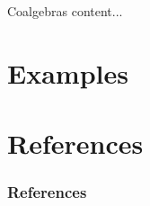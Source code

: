 \documentclass[10pt,t]{beamer}
\begin{document}
\begin{frame}{Coalgebras}
	content...
\end{frame}

\section{Examples}

\section*{References}

\begin{frame}%
	\frametitle{References}
	\nocite{whitney1935history}
	
	
\end{frame}
\end{document}
